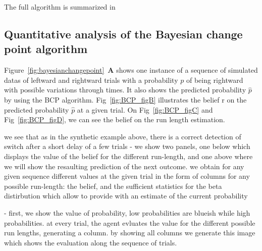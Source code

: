 \documentclass[profile,final,english, draft]{article}%
\newcommand{\seeFig}[1]{Figure~\ref{fig:#1}}
\begin{document}
The full algorithm is summarized in%
\subsection{Quantitative analysis of the Bayesian change point algorithm}



%
%
%
%

\seeFig{bayesianchangepoint}~\textbf{A} shows one instance of a sequence of simulated datas of leftward and rightward trials with a probability $p$ of being rightward with possible variations through times. It also shows the predicted probability $\hat{p}$ by using the BCP algorithm. Fig~\ref{fig:BCP_figB} illustrates the belief r on the predicted probability $\hat{p}$ at a given trial. On Fig~\ref{fig:BCP_figC} and Fig~\ref{fig:BCP_figD}, we can see the belief on the run length estimation.

we see that as in the synthetic example above,
there is a correct detection of switch after a short delay of a few trials
- we show two panels, one below which displays the value of the belief for the different run-length, and one above where we will show the resaulting prediction of the next outcome.
we obtain for any given sequence different values at the given trial in the form of columns for any possible run-length: the belief,
and the sufficient statistics for the beta distirbution which allow to provide with an estimate of the current probability

- first, we show the value of probability, low probabilities are blueish while high probabilities. at every trial, the agent evluates the value for the different possible run lengths, generating a column. by showing all columns we generate this image which shows the evaluation along the sequence of trials.
\end{document}
